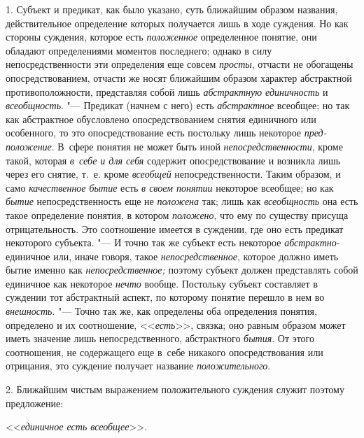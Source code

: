 1. Субъект и предикат, как было указано, суть ближайшим образом названия,
действительное определение которых получается лишь в ходе суждения. Но как
стороны суждения, которое есть {\em положенное} определенное понятие, они
обладают определениями моментов последнего; однако в силу непосредственности
эти определения еще совсем {\em просты}, отчасти не обогащены
опосредствованием, отчасти же носят ближайшим образом характер абстрактной
противоположности, представляя собой лишь {\em абстрактную единичность} и
{\em всеобщность}. "--- Предикат (начнем с него) есть {\em абстрактное}
всеобщее; но так как абстрактное обусловлено опосредствованием снятия
единичного или особенного, то это опосредствование есть постольку лишь
некоторое {\em пред-положение}. В~сфере понятия не может быть иной
{\em непосредственности}, кроме такой, которая {\em в~себе и для себя} содержит
опосредствование и возникла лишь через его снятие, т.~е. кроме {\em всеобщей}
непосредственности. Таким образом, и само {\em качественное бытие} есть {\em в
своем понятии} некоторое всеобщее; но как {\em бытие} непосредственность еще не
{\em положена} так; лишь как {\em всеобщность} она есть такое определение
понятия, в котором {\em положено}, что ему по существу присуща отрицательность.
Это соотношение имеется в суждении, где оно есть предикат некоторого субъекта.
"--- И точно так же субъект есть некоторое {\em абстрактно}-единичное или,
иначе говоря, такое {\em непосредственное}, которое должно иметь бытие именно
как {\em непосредственное;} поэтому субъект должен представлять собой единичное
как некоторое {\em нечто} вообще. Постольку субъект составляет в суждении тот
абстрактный аспект, по которому понятие перешло в нем во {\em внешность}. "---
Точно так же, как определены оба определения понятия, определено и их
соотношение, <<{\em есть}>>, связка; оно равным образом может иметь значение
лишь непосредственного, абстрактного {\em бытия}. От этого соотношения, не
содержащего еще в~себе никакого опосредствования или отрицания, это суждение
получает название {\em положительного}.

2. Ближайшим чистым выражением положительного суждения служит
поэтому предложение:

<<{\em единичное есть всеобщее}>>.

